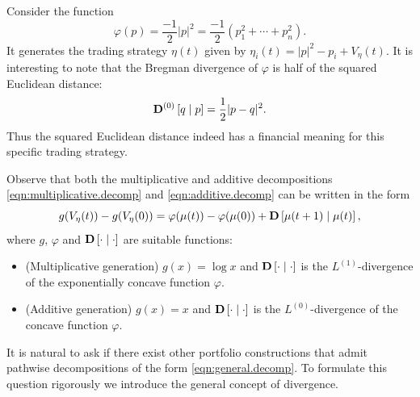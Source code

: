 \documentclass[graybox]{svmult}
\begin{document}
\begin{example} \label{eg:quadratic}
Consider the function
\[
\varphi(p) = \frac{-1}{2} |p|^2 = \frac{-1}{2} \left(p_1^2 + \cdots + p_n^2\right).
\]
It generates the trading strategy $\eta(t)$ given by $
\eta_i(t) = |p|^2 - p_i + V_{\eta}(t)$. It is interesting to note that the Bregman divergence of $\varphi$ is half of the squared Euclidean distance:
\[
{\bf D}^{(0)}\left[q \mid p\right] = \frac{1}{2} |p - q|^2.
\]
Thus the squared Euclidean distance indeed has a financial meaning for this specific trading strategy.
\end{example}

Observe that both the multiplicative and additive decompositions \eqref{eqn:multiplicative.decomp} and \eqref{eqn:additive.decomp} can be written in the form
\begin{equation} \label{eqn:general.decomp}
g(V_{\eta}(t)) - g(V_{\eta}(0)) = \varphi(\mu(t)) - \varphi(\mu(0)) + {\bf D}\left[\mu(t + 1) \mid \mu(t) \right],
\end{equation}
where $g$, $\varphi$ and ${\bf D}\left[ \cdot \mid \cdot\right]$ are suitable functions:
\begin{itemize}
\item (Multiplicative generation) $g(x) = \log x$ and ${\bf D}\left[ \cdot \mid \cdot\right]$ is the $L^{(1)}$-divergence of the exponentially concave function $\varphi$.
\item (Additive generation) $g(x) = x$ and ${\bf D}\left[ \cdot \mid \cdot\right]$ is the $L^{(0)}$-divergence of the concave function $\varphi$.
\end{itemize}


It is natural to ask if there exist other portfolio constructions that admit pathwise decompositions of the form \eqref{eqn:general.decomp}. To formulate this question rigorously we introduce the general concept of divergence.
\end{document}

